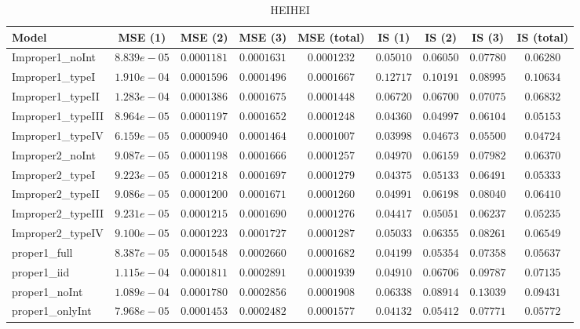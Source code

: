 \begin{table}

\caption{\label{tab:model-choice-sc12}HEIHEI}
\centering
\begin{tabular}{lcccccccc}
\hline
Model  & MSE (1) & MSE (2) & MSE (3) & MSE (total) & IS (1) & IS (2) & IS (3) & \multicolumn{1}{c}{IS (total)} \\ 
\hline
Improper1_noInt  & $8.839e-05$ & $0.0001181$ & $0.0001631$ & $0.0001232$ & $0.05010$ & $0.06050$ & $0.07780$ & $0.06280$ \\
Improper1_typeI  & $1.910e-04$ & $0.0001596$ & $0.0001496$ & $0.0001667$ & $0.12717$ & $0.10191$ & $0.08995$ & $0.10634$ \\
Improper1_typeII  & $1.283e-04$ & $0.0001386$ & $0.0001675$ & $0.0001448$ & $0.06720$ & $0.06700$ & $0.07075$ & $0.06832$ \\
Improper1_typeIII  & $8.964e-05$ & $0.0001197$ & $0.0001652$ & $0.0001248$ & $0.04360$ & $0.04997$ & $0.06104$ & $0.05153$ \\
Improper1_typeIV  & $6.159e-05$ & $0.0000940$ & $0.0001464$ & $0.0001007$ & $0.03998$ & $0.04673$ & $0.05500$ & $0.04724$ \\
Improper2_noInt  & $9.087e-05$ & $0.0001198$ & $0.0001666$ & $0.0001257$ & $0.04970$ & $0.06159$ & $0.07982$ & $0.06370$ \\
Improper2_typeI  & $9.223e-05$ & $0.0001218$ & $0.0001697$ & $0.0001279$ & $0.04375$ & $0.05133$ & $0.06491$ & $0.05333$ \\
Improper2_typeII  & $9.086e-05$ & $0.0001200$ & $0.0001671$ & $0.0001260$ & $0.04991$ & $0.06198$ & $0.08040$ & $0.06410$ \\
Improper2_typeIII  & $9.231e-05$ & $0.0001215$ & $0.0001690$ & $0.0001276$ & $0.04417$ & $0.05051$ & $0.06237$ & $0.05235$ \\
Improper2_typeIV  & $9.100e-05$ & $0.0001223$ & $0.0001727$ & $0.0001287$ & $0.05033$ & $0.06355$ & $0.08261$ & $0.06549$ \\
proper1_full  & $8.387e-05$ & $0.0001548$ & $0.0002660$ & $0.0001682$ & $0.04199$ & $0.05354$ & $0.07358$ & $0.05637$ \\
proper1_iid  & $1.115e-04$ & $0.0001811$ & $0.0002891$ & $0.0001939$ & $0.04910$ & $0.06706$ & $0.09787$ & $0.07135$ \\
proper1_noInt  & $1.089e-04$ & $0.0001780$ & $0.0002856$ & $0.0001908$ & $0.06338$ & $0.08914$ & $0.13039$ & $0.09431$ \\
proper1_onlyInt  & $7.968e-05$ & $0.0001453$ & $0.0002482$ & $0.0001577$ & $0.04132$ & $0.05412$ & $0.07771$ & $0.05772$ \\

\end{tabular}
\end{table}
